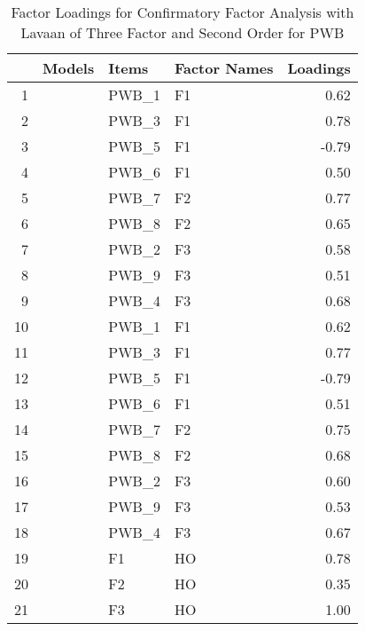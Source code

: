 \documentclass{article}\usepackage[]{graphicx}\usepackage[]{color}
\begin{document}
\begin{table}[ht]
\centering
\begin{tabular}{rlllr}
  \hline
 & Models & Items & Factor Names & Loadings \\ 
  \hline
1 &  & PWB\_1 & F1 & 0.62 \\ 
  2 &  & PWB\_3 & F1 & 0.78 \\ 
  3 &  & PWB\_5 & F1 & -0.79 \\ 
  4 &  & PWB\_6 & F1 & 0.50 \\ 
  5 &  & PWB\_7 & F2 & 0.77 \\ 
  6 &  & PWB\_8 & F2 & 0.65 \\ 
  7 &  & PWB\_2 & F3 & 0.58 \\ 
  8 &  & PWB\_9 & F3 & 0.51 \\ 
  9 &  & PWB\_4 & F3 & 0.68 \\ 
  10 &  & PWB\_1 & F1 & 0.62 \\ 
  11 &  & PWB\_3 & F1 & 0.77 \\ 
  12 &  & PWB\_5 & F1 & -0.79 \\ 
  13 &  & PWB\_6 & F1 & 0.51 \\ 
  14 &  & PWB\_7 & F2 & 0.75 \\ 
  15 &  & PWB\_8 & F2 & 0.68 \\ 
  16 &  & PWB\_2 & F3 & 0.60 \\ 
  17 &  & PWB\_9 & F3 & 0.53 \\ 
  18 &  & PWB\_4 & F3 & 0.67 \\ 
  19 &  & F1 & HO & 0.78 \\ 
  20 &  & F2 & HO & 0.35 \\ 
  21 &  & F3 & HO & 1.00 \\ 
   \hline
\end{tabular}
\caption{Factor Loadings for Confirmatory Factor Analysis with Lavaan of Three Factor and Second Order for PWB} 
\end{table}
\end{document}
